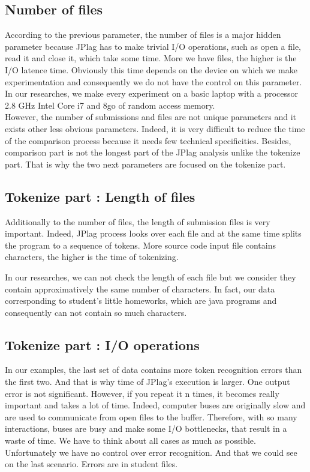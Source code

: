 \documentclass[twoside]{article}
\begin{document}
\begin{multicols*}{2}
\subsection{Number of files}

According to the previous parameter, the number of files is a major hidden parameter because JPlag has to make trivial I/O operations, such as open a file, read it and close it, which take some time. More we have files, the higher is the I/O latence time. Obviously this time depends on the device on which we make experimentation and consequently we do not have the control on this parameter. In our researches, we make every experiment on a basic laptop with a processor 2.8 GHz Intel Core i7 and 8go of random access memory. \\

However, the number of submissions and files are not unique parameters and it exists other less obvious parameters. Indeed, it is very difficult to reduce the time of the comparison process because it needs few technical specificities. Besides, comparison part is not the longest part of the JPlag analysis unlike the tokenize part. That is why the two next parameters are focused on the tokenize part.

\subsection{Tokenize part : Length of files}

Additionally to the number of files, the length of submission files is very important. Indeed, JPlag process looks over each file and at the same time splits the program to a sequence of tokens. More source code input file contains characters, the higher is the time of tokenizing.

In our researches, we can not check the length of each file but we consider they contain approximatively the same number of characters. In fact, our data corresponding to student's little homeworks, which are java programs and consequently can not contain so much characters.
\vfill

\newpage
\subsection{Tokenize part : I/O operations}

In our examples, the last set of data contains more token recognition errors than the first two. And that is why time of JPlag's execution is larger. One output error is not significant. However, if you repeat it n times, it becomes really important and takes a lot of time. Indeed, computer buses are originally slow and are used to communicate from open files to the buffer. Therefore, with so many interactions, buses are busy and make some I/O bottlenecks, that result in a waste of time. We have to think about all cases as much as possible. Unfortunately we have no control over error recognition. And that we could see on the last scenario. Errors are in student files. 


\end{multicols*}
\end{document}
